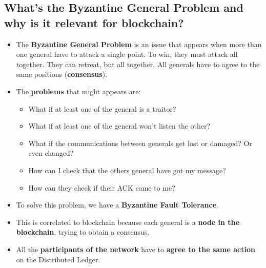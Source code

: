 \documentclass[9pt, letterpaper]{article}
\begin{document}
\subsection{What's the Byzantine General Problem and why is it relevant for blockchain?}
\begin{itemize}
	\item The \textbf{Byzantine General Problem} is an issue that appears when more than one general have to attack a single point.
	      To win, they must attack all together. They can retreat, but all together. All generals have to agree to the same positions (\textbf{consensus}).
	\item The \textbf{problems} that might appears are:
	      \begin{itemize}
		      \item What if at least one of the general is a traitor?
		      \item What if at least one of the general won't listen the other?
		      \item What if the communications between generals get lost or damaged? Or even changed?
		      \item How can I check that the others general have got my message?
		      \item How can they check if their ACK came to me?
	      \end{itemize}
	\item To solve this problem, we have a \textbf{Byzantine Fault Tolerance}.
	\item This is correlated to blockchain because each general is a \textbf{node in the blockchain}, trying to obtain a consensus.
	\item All the \textbf{participants of the network} have to \textbf{agree to the same action} on the Distributed Ledger.
\end{itemize}
\end{document}
